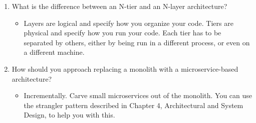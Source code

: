 \begin{enumerate}
\item
What is the difference between an N-tier and an N-layer architecture?

\begin{itemize}
\item 
Layers are logical and specify how you organize your code. Tiers are physical and specify how you run your code. Each tier has to be separated by others, either by being run in a different process, or even on a different machine.
\end{itemize}

\item
How should you approach replacing a monolith with a microservice-based architecture?

\begin{itemize}
\item 
Incrementally. Carve small microservices out of the monolith. You can use the strangler pattern described in Chapter 4, Architectural and System Design, to help you with this.
\end{itemize}
\end{enumerate}